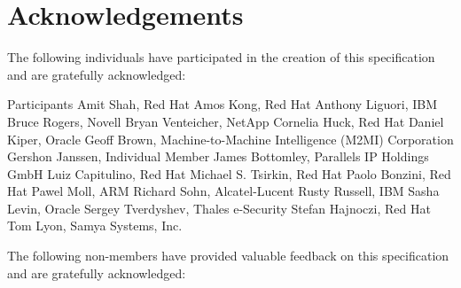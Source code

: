 \chapter{Acknowledgements}\label{chap:Acknowledgements}

The following individuals have participated in the creation of this specification and are gratefully acknowledged:

\begin{oasistitlesection}{Participants}
Amit Shah,	Red Hat	\newline
Amos Kong,	Red Hat	\newline
Anthony Liguori,	IBM	\newline
Bruce Rogers,	Novell	\newline
Bryan Venteicher,	NetApp	\newline
Cornelia Huck,	Red Hat	\newline
Daniel Kiper,	Oracle	\newline
Geoff Brown,	Machine-to-Machine Intelligence (M2MI) Corporation	\newline
Gershon Janssen,	Individual Member	\newline
James Bottomley,	Parallels IP Holdings GmbH	\newline
Luiz Capitulino,	Red Hat	\newline
Michael S. Tsirkin,	Red Hat	\newline
Paolo Bonzini,	Red Hat	\newline
Pawel Moll,	ARM \newline
Richard Sohn,	Alcatel-Lucent \newline
Rusty Russell,	IBM	\newline
Sasha Levin,	Oracle	\newline
Sergey Tverdyshev,	Thales e-Security	\newline
Stefan Hajnoczi,	Red Hat	\newline
Tom Lyon,	Samya Systems, Inc.	\newline
\end{oasistitlesection}

The following non-members have provided valuable feedback on this
specification and are gratefully acknowledged:

